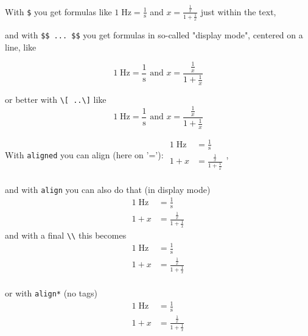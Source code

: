 \documentclass{ximera}
\begin{document}

With \verb|$| you get formulas like 
$1\;\textrm{Hz}=\frac{1}{\textrm{s}}$ and $ x =\frac{\frac1x}{1+\frac{1}{x}}$
just within the text,

and with \verb|$$ ... $$| you get formulas in so-called "display mode", centered on a line, like

$$
1\;\textrm{Hz}=\frac{1}{\textrm{s}} \text{ and } x =\frac{\frac1x}{1+\frac{1}{x}}
$$ 

or better with \verb|\[ ..\]|  like
\[
1\;\textrm{Hz}=\frac{1}{\textrm{s}} \text{ and } x =\frac{\frac1x}{1+\frac{1}{x}}
\] 

With \verb|aligned| you can align (here on '='):\quad
$
\begin{aligned}
    1\; \textrm{Hz}   & = \frac{1}{\textrm{s}}          \\
    1 + x             & = \frac{\frac1x}{1+\frac{1}{x}} \\
\end{aligned}
$,

and with \verb|align| you can also do that (in display mode)
\begin{align}
    1\; \textrm{Hz}   & = \frac{1}{\textrm{s}}          \\
    1 + x             & = \frac{\frac1x}{1+\frac{1}{x}} 
\end{align}
and with a final \verb|\\| this becomes
\begin{align}
    1\; \textrm{Hz}   & = \frac{1}{\textrm{s}}          \\
    1 + x             & = \frac{\frac1x}{1+\frac{1}{x}} \\
\end{align}

or with \verb|align*| (no tags)
\begin{align*}
    1\; \textrm{Hz}   & = \frac{1}{\textrm{s}}          \\
    1 + x             & = \frac{\frac1x}{1+\frac{1}{x}} 
\end{align*}

\end{document}
